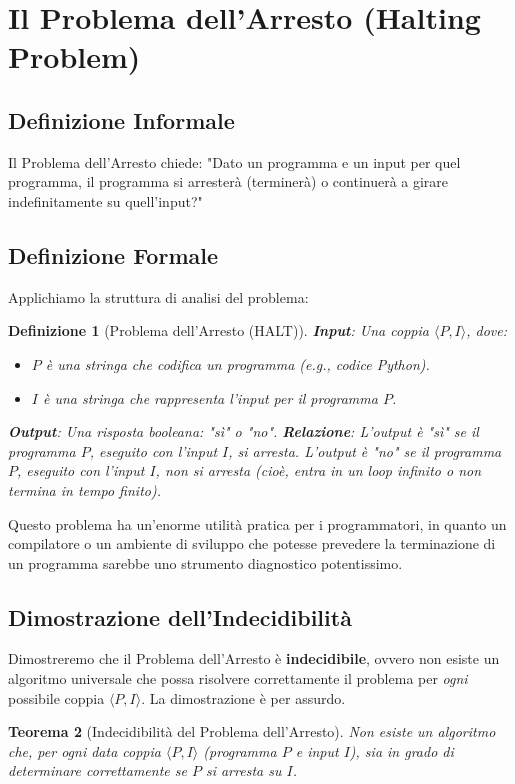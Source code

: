 \documentclass[a4paper, 11pt]{book} %
\newtheorem{theorem}{Teorema}[section]
\newtheorem{definition}[theorem]{Definizione}
\theoremstyle{definition}
\begin{document}
\section{Il Problema dell'Arresto (Halting Problem)}

\subsection{Definizione Informale}
Il Problema dell'Arresto chiede: "Dato un programma e un input per quel programma, il programma si arresterà (terminerà) o continuerà a girare indefinitamente su quell'input?"

\subsection{Definizione Formale}
Applichiamo la struttura di analisi del problema:

\begin{definition}[Problema dell'Arresto (HALT)]
\textbf{Input}: Una coppia $\langle P, I \rangle$, dove:
\begin{itemize}
    \item $P$ è una stringa che codifica un programma (e.g., codice Python).
    \item $I$ è una stringa che rappresenta l'input per il programma $P$.
\end{itemize}
\textbf{Output}: Una risposta booleana: "sì" o "no".
\textbf{Relazione}: L'output è "sì" se il programma $P$, eseguito con l'input $I$, si arresta. L'output è "no" se il programma $P$, eseguito con l'input $I$, non si arresta (cioè, entra in un loop infinito o non termina in tempo finito).
\end{definition}

Questo problema ha un'enorme utilità pratica per i programmatori, in quanto un compilatore o un ambiente di sviluppo che potesse prevedere la terminazione di un programma sarebbe uno strumento diagnostico potentissimo.

\subsection{Dimostrazione dell'Indecidibilità}
Dimostreremo che il Problema dell'Arresto è \textbf{indecidibile}, ovvero non esiste un algoritmo universale che possa risolvere correttamente il problema per \emph{ogni} possibile coppia $\langle P, I \rangle$. La dimostrazione è per assurdo.

\begin{theorem}[Indecidibilità del Problema dell'Arresto]
Non esiste un algoritmo che, per ogni data coppia $\langle P, I \rangle$ (programma $P$ e input $I$), sia in grado di determinare correttamente se $P$ si arresta su $I$.
\end{theorem}
\end{document}
